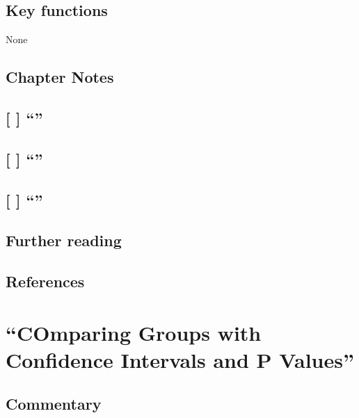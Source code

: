 \documentclass[]{book}
\theoremstyle{definition}
\theoremstyle{definition}
\theoremstyle{definition}
\theoremstyle{remark}
\begin{document}
\section*{Key functions}\label{key-functions-14}

None

\section*{Chapter Notes}\label{chapter-notes-15}

\section{\texorpdfstring{{[} {]} ``''}{{[} {]} }}\label{section-24}

\section{\texorpdfstring{{[} {]} ``''}{{[} {]} }}\label{section-25}

\section{\texorpdfstring{{[} {]} ``''}{{[} {]} }}\label{section-26}

\section*{Further reading}\label{further-reading-14}

\section*{References}\label{references-14}

\chapter{\texorpdfstring{``COmparing Groups with Confidence Intervals
and P
Values''}{COmparing Groups with Confidence Intervals and P Values}}\label{ch17}

\section*{Commentary}\label{commentary-15}
\end{document}
